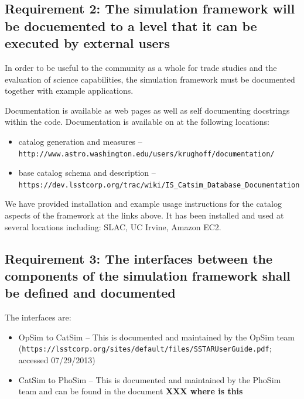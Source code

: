 \documentclass[]{article}
\begin{document}
{\subsection{Requirement 2: The simulation framework will be docuemented to a level that it can be
executed by external users}
In order to be useful to the community as a whole for trade studies and the evaluation of science 
capabilities, the simulation framework must be documented together with example applications.  

Documentation is available as web pages as well as self documenting docstrings within the code.  Documentation
is available on
at the following locations:
\begin{itemize}
\item catalog generation and measures -- {\tt http://www.astro.washington.edu/users/krughoff/documentation/}
\item base catalog schema and description -- {\tt https://dev.lsstcorp.org/trac/wiki/IS\_Catsim\_Database\_Documentation}
\end{itemize}

We have provided installation and example usage instructions for the catalog 
aspects of the framework at the links above.  
It has been installed and used at several locations 
including: SLAC, UC Irvine, Amazon EC2.

\subsection{Requirement 3: The interfaces between the components of the simulation framework shall be defined 
and documented}
The interfaces are:
\begin{itemize}
\item OpSim to CatSim -- This is documented and maintained by the OpSim team 
({\tt https://lsstcorp.org/sites/default/files/SSTARUserGuide.pdf}; accessed 07/29/2013)
\item CatSim to PhoSim -- This is documented and maintained by the PhoSim team and can be found in the document
{\bf XXX where is this}
\end{itemize}

}
\end{document}
